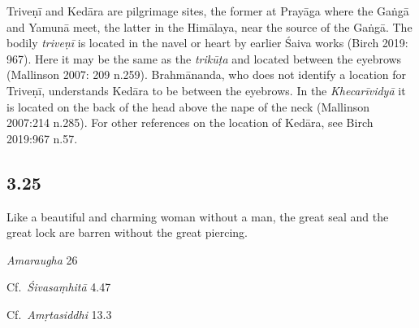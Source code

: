 \begin{ekdosis}
\begin{philcomm}[hp03_024]
Triveṇī and Kedāra are pilgrimage sites, the former at Prayāga where the Gaṅgā and Yamunā meet, the latter in the Himālaya, near the source of the Gaṅgā. The bodily \emph{triveṇī} is located in the navel or heart by earlier Śaiva works (Birch 2019: 967). Here it may be the same as the \emph{trikūṭa} and located between the eyebrows (Mallinson 2007: 209 n.259). Brahmānanda, who does not identify a location for Triveṇī, understands Kedāra to be between the eyebrows. In the \emph{Khecarīvidyā} it is located on the back of the head above the nape of the neck (Mallinson 2007:214 n.285). For other references on the location of Kedāra, see Birch 2019:967 n.57.
\end{philcomm}

\subsection*{3.25}
\begin{translation}[hp03_025]
Like a beautiful and charming woman without a man, the great seal and the great lock are barren without the great piercing.\\
\end{translation}

\begin{sources}[hp03_025]
\emph{Amaraugha} 26
\begin{versinnote}
\tl{\var{°bandhau niṣphalau vedhavarjitau ] °bandho niṣphalo vedhavarjitaḥ \vl}\\!}
\end{versinnote}

Cf.~\emph{Śivasaṃhitā} 4.47
\begin{versinnote}
\end{versinnote}

Cf.~\emph{Amṛtasiddhi} 13.3
\begin{versinnote}
\end{versinnote}
\end{sources}


\end{ekdosis}
